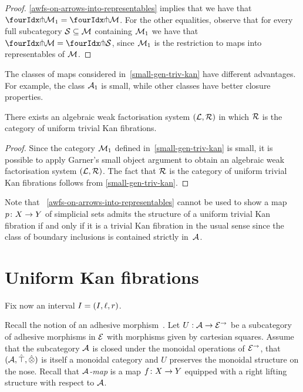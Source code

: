 \documentclass[reqno,10pt,a4paper,oneside]{amsart}
\begin{document}
\begin{proof}    \cref{awfs-on-arrows-into-representables} implies that we have that $\liftr{\cal{M}_1}  = \liftr{\cal{M}}$.
For the other equalities, observe that for every full subcategory $\cal{S} \subseteq \cal{M}$ containing $\cal{M}_1$ we have that $\liftr{\cal{M}} = \liftr{\cal{S}}$, since $\cal{M}_1$ is the restriction to maps into representables  of $\cal{M}$. 
\end{proof}

The classes of maps considered in~\cref{small-gen-triv-kan} have different advantages. For example, 
the class $\cal{A}_1$ is small, while other classes have better closure properties. 




\begin{corollary} There exists an algebraic weak factorisation system $(\cal{L}, \cal{R})$ in which
$\cal{R}$ is the category of uniform trivial Kan fibrations.
\end{corollary}

\begin{proof} Since the category $\cal{M}_1$ defined in~\cref{small-gen-triv-kan} is small,  
it is possible to apply Garner's small object argument to
obtain an algebraic weak factorisation system $(\cal{L}, \cal{R})$.
The fact that $\cal{R}$ is the category of uniform trivial Kan fibrations
 follows from \cref{small-gen-triv-kan}.
 \end{proof} 

Note that ~\cref{awfs-on-arrows-into-representables} cannot be used to show 
a map $p \co X \to Y$ of simplicial sets admits the structure of a uniform trivial Kan fibration if and only if it is a trivial Kan fibration in the usual sense since  the class of boundary inclusions  is contained strictly  in~$\cal{A}$. 




\section{Uniform Kan fibrations}

Fix now an interval $\interval = (\interval, \intervall, \intervalr)$. 

\medskip


Recall the notion of an adhesive morphism~\cite{garner-lack:adhesive}.  Let $U : \cal{A} \to \catE^{\to}$ be a subcategory of adhesive morphisms in $\catE$ with morphisms given by cartesian squares. Assume that the subcategory $\cal{A}$ is closed under the monoidal operations of $\catE^{\to}$, \ie that $(\cal{A}, \hatunit, \hatotimes)$ is itself a monoidal category and $U$ preserves the monoidal structure on the nose. Recall that \emph{$\cal{A}$-map} is a map $f \co X \to Y$ equipped with a right lifting structure with respect to $\cal{A}$.
\end{document}
